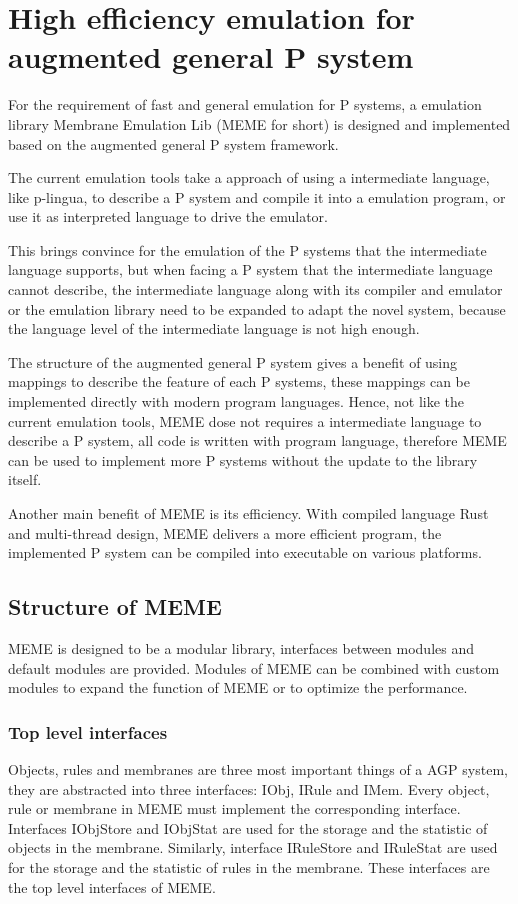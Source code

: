 \documentclass[9pt,a4paper,twoside]{article}
\begin{document}
    \section{High efficiency emulation for augmented general P system}

    For the requirement of fast and general emulation for P systems, a emulation library Membrane Emulation Lib (MEME for short) is designed and implemented based on the augmented general P system framework.

    The current emulation tools take a approach of using a intermediate language, like p-lingua, to describe a P system and compile it into a emulation program, or use it as interpreted language to drive the emulator. 
    
    This brings convince for the emulation of the P systems that the intermediate language supports, but when facing a P system that the intermediate language cannot describe, the intermediate language along with its compiler and emulator or the emulation library need to be expanded to adapt the novel system, because the language level of the intermediate language is not high enough.

    The structure of the augmented general P system gives a benefit of using mappings to describe the feature of each P systems, these mappings can be implemented directly with modern program languages. Hence, not like the current emulation tools, MEME dose not requires a intermediate language to describe a P system, all code is written with program language, therefore MEME can be used to implement more P systems without the update to the library itself.

    Another main benefit of MEME is its efficiency. With compiled language Rust and multi-thread design, MEME delivers a more efficient program, the implemented P system can be compiled into executable on various platforms.

    \subsection{Structure of MEME}
    MEME is designed to be a modular library, interfaces between modules and default modules are provided. 
    Modules of MEME can be combined with custom modules to expand the function of MEME or to optimize the performance. 

        \subsubsection{Top level interfaces}
        Objects, rules and membranes are three most important things of a AGP system, they are abstracted into three interfaces: IObj, IRule and IMem.
        Every object, rule or membrane in MEME must implement the corresponding interface.
        Interfaces IObjStore and IObjStat are used for the storage and the statistic of objects in the membrane. 
        Similarly, interface IRuleStore and IRuleStat are used for the storage and the statistic of rules in the membrane. 
        These interfaces are the top level interfaces of MEME.
\end{document}
